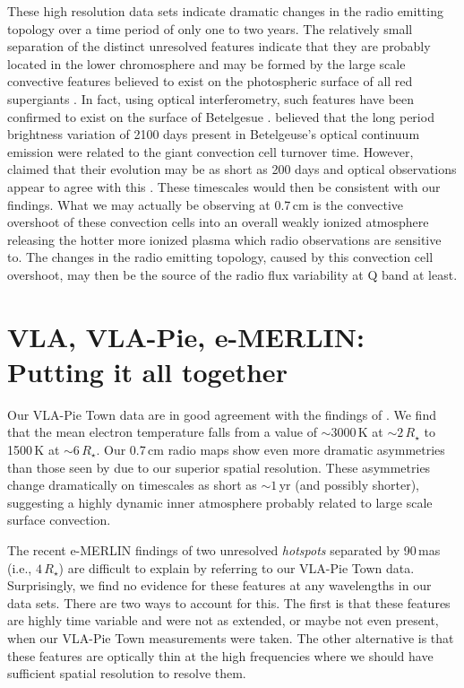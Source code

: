 These high resolution data sets indicate dramatic changes in the radio emitting topology over a time period of only one to two years. The relatively small separation of the distinct unresolved features indicate that they are probably located in the lower chromosphere and may be formed by the large scale convective features believed to exist on the photospheric surface of all red supergiants \citep{schwarzschild_1975}. In fact, using optical interferometry, such features have been confirmed to exist on the surface of Betelgesue \citep[e.g.,][]{chiavassa_2010, buscher_1990, wilson_1992, tuthill_1997}. \cite{stothers_1971} believed that the long period brightness variation of 2100 days present in Betelgeuse's optical continuum emission were related to the giant convection cell turnover time. However, \cite{schwarzschild_1975} claimed that their evolution may be as short as 200 days and optical observations appear to agree with this \citep{tuthill_1997}. These timescales would then be consistent with our findings. What we may actually be observing at 0.7\,cm is the convective overshoot of these convection cells into an overall weakly ionized atmosphere \citep{josselin_2007,gray_2008} releasing the hotter more ionized plasma which radio observations are sensitive to. The changes in the radio emitting topology, caused by this convection cell overshoot, may then be the source of the radio flux variability at Q band at least.

\section{VLA, VLA-Pie, e-MERLIN: Putting it all together}\label{sec:5.15}
Our VLA-Pie Town data are in good agreement with the findings of \cite{lim_1998}. We find that the mean electron temperature falls from a value of $\sim 3000$\,K at $\sim 2\,R_{\star}$ to 1500\,K at $\sim 6\,R_{\star}$. Our 0.7\,cm radio maps show even more dramatic asymmetries than those seen by \cite{lim_1998} due to our  superior spatial resolution. These asymmetries change dramatically on timescales as short as $\sim 1$\,yr (and possibly shorter), suggesting a highly dynamic inner atmosphere probably related to large scale surface convection.

The recent e-MERLIN findings of two unresolved \textit{hotspots} separated by 90\,mas (i.e., $4\,R_{\star}$) are difficult to explain by referring to our VLA-Pie Town data. Surprisingly, we find no evidence for these features at any wavelengths in our data sets. There are two ways to account for this. The first is that these features are highly time variable and were not as extended, or maybe not even present, when our VLA-Pie Town measurements were taken. The other alternative is that these features are optically thin at the high frequencies where we should have sufficient spatial resolution to resolve them. 

